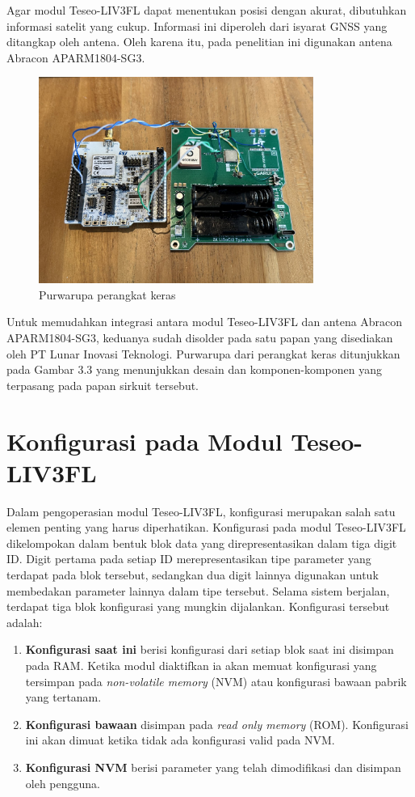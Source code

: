 Agar modul Teseo\hyp{}LIV3FL dapat menentukan posisi dengan akurat, dibutuhkan informasi satelit yang cukup. Informasi ini diperoleh dari isyarat GNSS yang ditangkap oleh antena. Oleh karena itu, pada penelitian ini digunakan antena Abracon APARM1804-SG3.

\begin{figure}[H]
	\centering
	\includegraphics[width=9cm]{contents/chapter-3/purwarupa.jpg}
	\caption{Purwarupa perangkat keras}
	\label{Fig: purwarupa-alat}
\end{figure}

Untuk memudahkan integrasi antara modul Teseo\hyp{}LIV3FL dan antena Abracon APARM1804-SG3, keduanya sudah disolder pada satu papan yang disediakan oleh PT Lunar Inovasi Teknologi. Purwarupa dari perangkat keras ditunjukkan pada Gambar 3.3 yang menunjukkan desain dan komponen-komponen yang terpasang pada papan sirkuit tersebut.

\section{Konfigurasi pada Modul Teseo\hyp{}LIV3FL}
Dalam pengoperasian modul Teseo\hyp{}LIV3FL, konfigurasi merupakan salah satu elemen penting yang harus diperhatikan. Konfigurasi pada modul Teseo\hyp{}LIV3FL dikelompokan dalam bentuk blok data yang direpresentasikan dalam tiga digit ID. Digit pertama pada setiap ID merepresentasikan tipe parameter yang terdapat pada blok tersebut, sedangkan dua digit lainnya digunakan untuk membedakan parameter lainnya dalam tipe tersebut. Selama sistem berjalan, terdapat tiga blok konfigurasi yang mungkin dijalankan. Konfigurasi tersebut adalah:

\begin{enumerate}
	\item \textbf{Konfigurasi saat ini} berisi konfigurasi dari setiap blok saat ini disimpan pada RAM. Ketika modul diaktifkan ia akan memuat konfigurasi yang tersimpan pada \textit{non-volatile memory} (NVM) atau konfigurasi bawaan pabrik yang tertanam.
	\item \textbf{Konfigurasi bawaan} disimpan pada \textit{read only memory} (ROM). Konfigurasi ini akan dimuat ketika tidak ada konfigurasi valid pada NVM.
	\item \textbf{Konfigurasi NVM} berisi parameter yang telah dimodifikasi dan disimpan oleh pengguna.
\end{enumerate}

